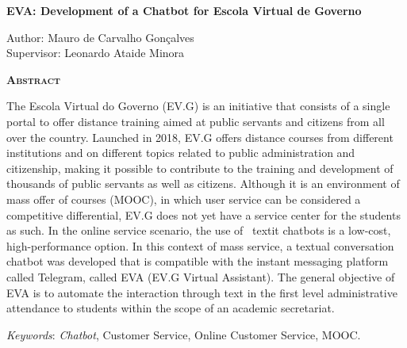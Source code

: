 \begin{center}
	{\Large{\textbf{EVA: Development of a Chatbot for Escola Virtual de Governo}}}
\end{center}

\vspace{1cm}

\begin{flushright}
	Author: Mauro de Carvalho Gonçalves\\
	Supervisor: Leonardo Ataide Minora
\end{flushright}

\vspace{1cm}

\begin{center}
	\Large{\textsc{\textbf{Abstract}}}
\end{center}

\noindent The Escola Virtual do Governo (EV.G) is an initiative that consists of a single portal to offer distance training aimed at public servants and citizens from all over the country.
Launched in 2018, EV.G offers distance courses from different institutions and on different topics related to public administration and citizenship, making it possible to contribute to the training and development of thousands of public servants as well as citizens.
Although it is an environment of mass offer of courses (MOOC), in which user service can be considered a competitive differential, EV.G does not yet have a service center for the students as such.
In the online service scenario, the use of \ textit {chatbots} is a low-cost, high-performance option.
In this context of mass service, a textual conversation chatbot was developed that is compatible with the instant messaging platform called Telegram, called EVA (EV.G Virtual Assistant). The general objective of EVA is to automate the interaction through text in the first level administrative attendance to students within the scope of an academic secretariat.

\noindent\textit{Keywords}: \textit{Chatbot}, Customer Service, Online Customer Service, MOOC.
